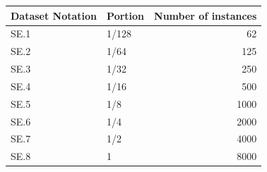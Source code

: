 \begin{tabular}{llr}
\toprule
Dataset Notation & Portion & Number of instances \\
\midrule
SE.1 & 1/128 & 62 \\
SE.2 & 1/64 & 125 \\
SE.3 & 1/32 & 250 \\
SE.4 & 1/16 & 500 \\
SE.5 & 1/8 & 1000 \\
SE.6 & 1/4 & 2000 \\
SE.7 & 1/2 & 4000 \\
SE.8 & 1 & 8000 \\
\bottomrule
\end{tabular}
